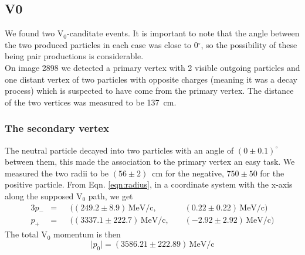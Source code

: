 \documentclass[twocolumn]{article}
\begin{document}
\subsection{V0}
We found two V$_0$-canditate events. It is important to note that the angle between the two produced particles in each case was close to 0$^{\circ}$, so the possibility of these being pair productions is considerable.\\
On image 2898 we detected a primary vertex with 2 visible outgoing particles and one distant vertex of two particles with opposite charges (meaning it was a decay process) which is suspected to have come from the primary vertex. The distance of the two vertices was measured to be 137~cm. 
\subsubsection{The secondary vertex}
The neutral particle decayed into two particles with an angle of $(0\pm 0.1)^{\circ} $ between them, this made the association to the primary vertex an easy task. We measured the two radii to be $(56 \pm 2)$~cm for the negative, $750 \pm 50$ for the positive particle. From Eqn. \ref{eqn:radius}, in a coordinate system with the x-axis along the supposed V$_0$ path, we get 
\begin{alignat*}{3}
p_- &= &&((249.2 \pm 8.9)\, \text{MeV/c},\hspace{3pt} && (0.22 \pm 0.22)\, \text{MeV/c})\\
p_+ &= &&((3337.1 \pm 222.7)\, \text{MeV/c},\hspace{3pt} && (-2.92 \pm 2.92)\, \text{MeV/c})
\end{alignat*}
The total V$_0$ momentum is then
\begin{equation}
 \vert p_0 \vert = (3586.21 \pm 222.89)\, \text{MeV/c}
\end{equation}
\end{document}
